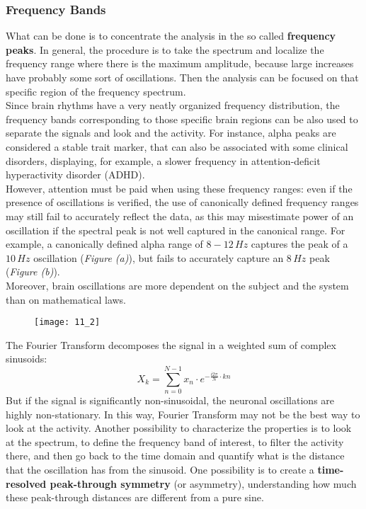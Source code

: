 \subsubsection{Frequency Bands}
What can be done is to concentrate the analysis in the so called \textbf{frequency peaks}. In general, the procedure is to take the spectrum and localize the frequency range where there is the maximum amplitude, because large increases have probably some sort of oscillations. 
Then the analysis can be focused on that specific region of the frequency spectrum.\\
Since brain  rhythms have a very neatly organized frequency distribution, the frequency bands corresponding to those specific brain regions can be also used to separate the signals and look and the activity. For instance, alpha peaks are considered a stable trait marker, that can also be associated with some clinical disorders, displaying, 
for example, a slower frequency in attention-deficit hyperactivity disorder (ADHD).\\
However, attention must be paid when using these frequency ranges: even if the presence of oscillations is verified, the use of canonically defined frequency ranges may still fail to accurately reflect the 
data, as this may misestimate power of an oscillation if the spectral peak is not well captured in the canonical range. For example, a canonically defined alpha range 
of \(8-12\,Hz\) captures the peak of a \(10\,Hz\) oscillation (\textit{Figure (a)}), but fails to accurately capture an \(8\,Hz\) peak (\textit{Figure (b)}).\\
Moreover, brain oscillations are more dependent on the subject and the system than on mathematical laws.
\begin{figure}[H]
    \texttt{[image: 11\_2]}
    \centering
\end{figure}
The Fourier Transform decomposes the signal in a weighted sum of complex sinusoids:
\begin{equation*}
    X_k=\sum_{n=0}^{N-1} x_n\cdot e^{-\frac{i2\pi}{N}\cdot kn}
\end{equation*}
But if the signal is significantly non-sinusoidal, the neuronal oscillations are highly non-stationary. In this way, Fourier Transform may not 
be the best way to look at the activity. Another possibility to characterize the properties is to look at the spectrum, to define the frequency band of interest, to filter 
the activity there, and then go back to the time domain and quantify what is the distance that the oscillation has from the sinusoid. One possibility is to create a \textbf{time-resolved 
peak-through symmetry} (or asymmetry), understanding how much these peak-through distances are different from a pure sine.

